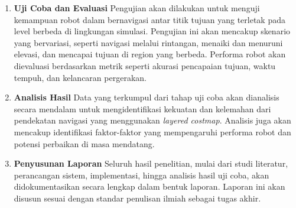 \begin{enumerate}
  \item \textbf{Uji Coba dan Evaluasi} \newline Pengujian akan dilakukan untuk
  menguji kemampuan robot dalam bernavigasi antar titik tujuan yang
  terletak pada level berbeda di lingkungan simulasi. Pengujian ini
  akan mencakup skenario yang bervariasi, seperti navigasi melalui
  rintangan, menaiki dan menuruni elevasi, dan mencapai tujuan di
  region yang berbeda. Performa robot akan dievaluasi berdasarkan
  metrik seperti akurasi pencapaian tujuan, waktu tempuh, dan
  kelancaran pergerakan.

  \item \textbf{Analisis Hasil} \newline Data yang terkumpul dari tahap uji
  coba akan dianalisis secara mendalam untuk mengidentifikasi kekuatan
  dan kelemahan dari pendekatan navigasi yang menggunakan \emph{layered
  costmap}. Analisis juga akan mencakup identifikasi faktor-faktor
  yang mempengaruhi performa robot dan potensi perbaikan di masa
  mendatang.

  \item \textbf{Penyusunan Laporan} \newline Seluruh hasil penelitian, mulai
  dari studi literatur, perancangan sistem, implementasi, hingga
  analisis hasil uji coba, akan didokumentasikan secara lengkap dalam
  bentuk laporan. Laporan ini akan disusun sesuai dengan standar
  penulisan ilmiah sebagai tugas akhir.
\end{enumerate}

